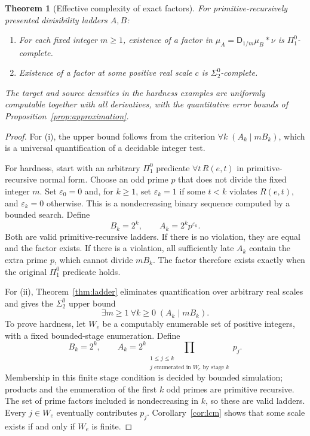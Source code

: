 \documentclass[11pt,a4paper]{article}
\newtheorem{theorem}{Theorem}[section]
\theoremstyle{definition}
\theoremstyle{remark}
\newcommand{\D}{\mathsf D}
\begin{document}
\begin{theorem}[Effective complexity of exact factors]\label{thm:complexity}
For primitive-recursively presented divisibility ladders $A,B$:
\begin{enumerate}[label=(\roman*)]
\item For each fixed integer $m\ge1$, existence of a factor in
$\mu_A=\D_{1/m}\mu_B*\nu$ is $\Pi^0_1$-complete.
\item Existence of a factor at \emph{some} positive real scale $c$ is
$\Sigma^0_2$-complete.
\end{enumerate}
The target and source densities in the hardness examples are uniformly
computable together with all derivatives, with the quantitative error
bounds of Proposition~\ref{prop:approximation}.
\end{theorem}
\begin{proof}
For (i), the upper bound follows from the criterion
$\forall k\;(A_k\mid mB_k)$, which is a universal quantification of a
decidable integer test.

For hardness, start with an arbitrary $\Pi^0_1$ predicate
$\forall t\,R(e,t)$ in primitive-recursive normal form. Choose an odd prime
$p$ that does not divide the fixed integer $m$. Set $\varepsilon_0=0$ and,
for $k\ge1$, set $\varepsilon_k=1$ if some $t<k$ violates $R(e,t)$,
and $\varepsilon_k=0$ otherwise. This is a nondecreasing binary sequence
computed by a bounded search. Define
\[
 B_k=2^k,\qquad A_k=2^kp^{\varepsilon_k}.
\]
Both are valid primitive-recursive ladders. If there is no violation, they
are equal and the factor exists. If there is a violation, all sufficiently
late $A_k$ contain the extra prime $p$, which cannot divide $mB_k$.
The factor therefore exists exactly when the original $\Pi^0_1$
predicate holds.

For (ii), Theorem~\ref{thm:ladder} eliminates quantification over arbitrary
real scales and gives the $\Sigma^0_2$ upper bound
\[
 \exists m\ge1\ \forall k\ge0\;(A_k\mid mB_k).
\]
To prove hardness, let $W_e$ be a computably enumerable set of positive
integers, with a fixed bounded-stage enumeration. Define
\begin{equation}\label{eq:ce-ladders}
 B_k=2^k,\qquad
 A_k=2^k\prod_{\substack{1\le j\le k\\
                    j\text{ enumerated in }W_e\text{ by stage }k}}p_j.
\end{equation}
Membership in this finite stage condition is decided by bounded simulation;
products and the enumeration of the first $k$ odd primes are primitive
recursive. The set of prime factors included is nondecreasing in $k$, so
these are valid ladders. Every $j\in W_e$ eventually contributes $p_j$.
Corollary~\ref{cor:lcm} shows that some scale exists if and only if $W_e$
is finite.


\end{proof}
\end{document}
